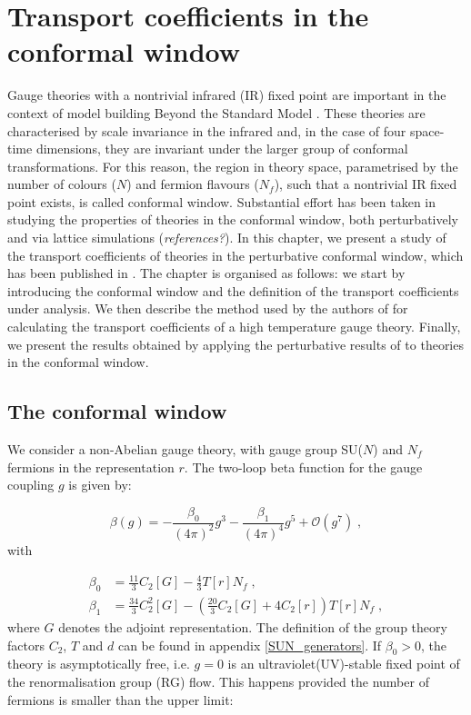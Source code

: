 \chapter{Transport coefficients in the conformal window}

Gauge theories with a nontrivial infrared (IR) fixed point are important in the context of model building Beyond the Standard Model \cite{Sannino:2008ha}. These theories are characterised by scale invariance in the infrared and, in the case of four space-time dimensions, they are invariant under the larger group of conformal transformations. For this reason, the region in theory space, parametrised by the number of colours ($N$) and fermion flavours ($N_f$), such that a nontrivial IR fixed point exists, is called conformal window.
Substantial effort has been taken in studying the properties of theories in the conformal window, both perturbatively and via lattice simulations (\emph{references?}). In this chapter, we present a study of the transport coefficients of theories in the perturbative conformal window, which has been published in \cite{Toniato:2016twr}.
The chapter is organised as follows: we start by introducing the conformal window and the definition of the transport coefficients under analysis. We then describe the method used by the authors of \cite{Arnold:2000dr} for calculating the transport coefficients of a high temperature gauge theory. Finally, we present the results obtained by applying the perturbative results of \cite{Arnold:2000dr} to theories in the conformal window. 


\section{The conformal window}
\label{ conformal_window}

We consider a non-Abelian gauge theory, with gauge group SU($N$) and $N_f$ fermions in the representation $r$. The two-loop beta function for the gauge coupling $g$ is given by:

 \begin{equation}
 \beta (g) = - \frac{\beta_0}{(4\pi)^2} g^3 - \frac{\beta_1}{(4\pi)^4} g^5 + \mathcal{O}(g^{7}) \; ,
 \label{beta_f}
 \end{equation}
%
with

 \begin{align}
\beta_0 &= \frac{11}{3} C_2[G] - \frac{4}{3} T[r] N_f\; , \\
\beta_1 &= \frac{34}{3} C_2^2[G] - \left ( \frac{20}{3} C_2[G] + 4 C_2[r] \right ) T[r] N_f\; ,
\end{align}
%
where $G$ denotes the adjoint representation. The definition of the group theory factors $C_2$, $T$ and $d$ can be found in appendix \ref{SUN_generators}. If $\beta_0 > 0$, the theory is asymptotically free, i.e. $g=0$ is an ultraviolet(UV)-stable fixed point of the renormalisation group (RG) flow. This happens provided the number of fermions is smaller than the upper limit:

